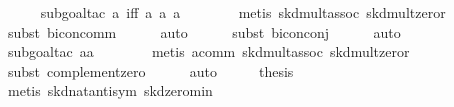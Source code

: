 \begin{isabellebody}
\ \ \ \ \isamarkupfalse%
\ {}subgoal{}tac\ {}a{}\ iff\ a{}{}\ a{}{}\ {}a{}\ {}\ {}{}{}\isanewline
\ \ \ \ \isamarkupfalse%
\ {}metis\ skd{}mult{}assoc\ skd{}mult{}zeror{}\isanewline
\ \ \ \ \isamarkupfalse%
\ {}subst\ bicon{}comm{}\isanewline
\ \ \ \ \isamarkupfalse%
\ auto\isanewline
\ \ \ \ \isamarkupfalse%
\ {}subst\ bicon{}conj{}{}\isanewline
\ \ \ \ \isamarkupfalse%
\ auto\isanewline
\ \ \ \ \isamarkupfalse%
\ {}subgoal{}tac\ {}a{}{}{}a{}\ {}\ {}{}{}\isanewline
\ \ \ \ \isamarkupfalse%
\ {}metis\ a{}comm\ skd{}mult{}assoc\ skd{}mult{}zeror{}\isanewline
\ \ \ \ \isamarkupfalse%
\ {}subst\ complement{}zero{}\isanewline
\ \ \ \ \isamarkupfalse%
\ auto\isanewline
\ \ \isamarkupfalse%
\ \isamarkupfalse%
\ {}thesis\isanewline
\ \ \ \ \isamarkupfalse%
\ {}metis\ skd{}nat{}antisym\ skd{}zero{}min{}\isanewline

\end{isabellebody}
